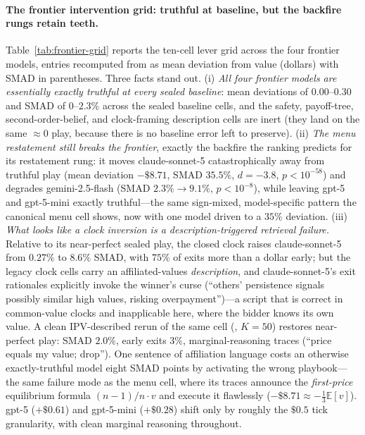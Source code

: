 \paragraph{The frontier intervention grid: truthful at baseline, but the backfire rungs retain teeth.} Table~\ref{tab:frontier-grid} reports the ten-cell lever grid across the four frontier models, entries recomputed from  as mean deviation from value (dollars) with SMAD in parentheses. Three facts stand out. (i) \emph{All four frontier models are essentially exactly truthful at every sealed baseline}: mean deviations of $0.00$--$0.30$ and SMAD of $0$--$2.3\%$ across the sealed baseline cells, and the safety, payoff-tree, second-order-belief, and clock-framing description cells are inert (they land on the same $\approx\!0$ play, because there is no baseline error left to preserve). (ii) \emph{The menu restatement still breaks the frontier}, exactly the backfire the ranking predicts for its restatement rung: it moves claude-sonnet-5 catastrophically away from truthful play (mean deviation $-\$8.71$, SMAD $35.5\%$, $d=-3.8$, $p<10^{-58}$) and degrades gemini-2.5-flash (SMAD $2.3\% \to 9.1\%$, $p<10^{-8}$), while leaving gpt-5 and gpt-5-mini exactly truthful---the same sign-mixed, model-specific pattern the canonical menu cell shows, now with one model driven to a $35\%$ deviation. (iii) \emph{What looks like a clock inversion is a description-triggered retrieval failure.} Relative to its near-perfect sealed play, the closed clock raises claude-sonnet-5 from $0.27\%$ to $8.6\%$ SMAD, with $75\%$ of exits more than a dollar early; but the legacy clock cells carry an affiliated-values \emph{description}, and claude-sonnet-5's exit rationales explicitly invoke the winner's curse (``others' persistence signals possibly similar high values, risking overpayment'')---a script that is correct in common-value clocks and inapplicable here, where the bidder knows its own value. A clean IPV-described rerun of the same cell (, $K=50$) restores near-perfect play: SMAD $2.0\%$, early exits $3\%$, marginal-reasoning traces (``price equals my value; drop''). One sentence of affiliation language costs an otherwise exactly-truthful model eight SMAD points by activating the wrong playbook---the same failure mode as the menu cell, where its traces announce the \emph{first-price} equilibrium formula $(n-1)/n\cdot v$ and execute it flawlessly ($-\$8.71 \approx -\tfrac{1}{3}\mathbb{E}[v]$). gpt-5 ($+\$0.61$) and gpt-5-mini ($+\$0.28$) shift only by roughly the $\$0.5$ tick granularity, with clean marginal reasoning throughout.

